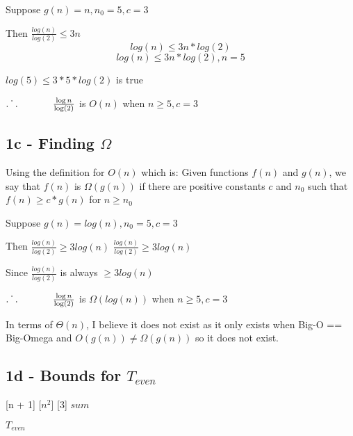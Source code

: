 \documentclass[oneside, a4paper]{article}
\begin{document}
\begin{center}
    Suppose $g(n) = n, n_0 = 5, c = 3$

    Then $\frac{log(n)}{log(2)} \leq 3n$
    $$log(n) \leq 3n * log(2)$$
    $$log(n) \leq 3n * log(2), n = 5$$

    $log(5) \leq 3 * 5 * log(2)$ is true

    $\dot{.\hspace{.095in}.}\hspace{.5in} \frac{\log{n}}{\log(2)}$ is $O(n)$ when $n \geq 5, c = 3$
\end{center}

 
\subsection*{1c - Finding $\Omega$}
Using the definition for $O(n)$ which is:
Given functions $f(n)$ and $g(n)$, we say that $f(n)$ is $\Omega(g(n))$ if there are positive constants $c$ and $n_0$ such that $f(n) \geq c * g(n)$ for $n \geq n_0$

\begin{center}
    Suppose $g(n) = log(n), n_0 = 5, c = 3$

    Then $\frac{log(n)}{log(2)} \geq 3log(n)$
    $\frac{log(n)}{log(2)} \geq 3log(n)$

    Since $\frac{log(n)}{log(2)}$ is always $\geq 3log(n)$ 

    $\dot{.\hspace{.095in}.}\hspace{.5in} \frac{\log{n}}{\log(2)}$ is $\Omega(log(n))$ when $n \geq 5, c = 3$
\end{center}

In terms of $\Theta(n)$, I believe it does not exist as it only exists when Big-O == Big-Omega and $O(g(n)) \neq \Omega(g(n))$ so it does not exist.

\subsection*{1d - Bounds for $T_{even}$}

\begin{algorithmic}
     [n + 1]
         [$n^2$]
             [3]
        \EndFor
    \EndFor
    \State \Return $sum$
    \EndFunction
\end{algorithmic}

$T_{even}$
\end{document}
